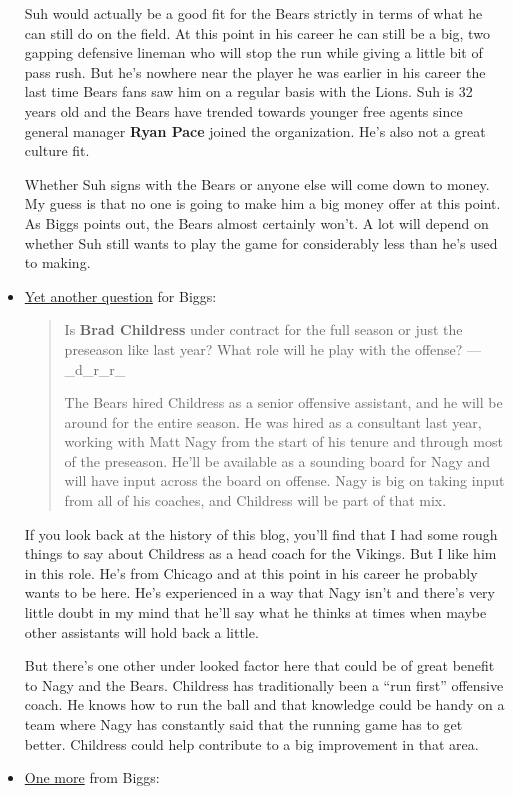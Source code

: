 \documentclass[11pt]{article}
\begin{document}
\begin{itemize}
Suh would actually be a good fit for the Bears strictly in terms of what he can still do on the field.  At this point in his career he can still be a big, two gapping defensive lineman who will stop the run while giving a little bit of pass rush.  But he's nowhere near the player he was earlier in his career the last time Bears fans saw him on a regular basis with the Lions.  Suh is 32 years old and the Bears have trended towards younger free agents since general manager \textbf{Ryan Pace} joined the organization.  He's also not a great culture fit.

Whether Suh signs with the Bears or anyone else will come down to money.  My guess is that no one is going to make him a big money offer at this point.  As Biggs points out, the Bears almost certainly won't.  A lot will depend on whether Suh still wants to play the game for considerably less than he's used to making.
\item \href{https://www.chicagotribune.com/sports/football/bears/ct-spt-bears-mailbag-receivers-kicker-competition-20190508-story.html}{Yet another question} for Biggs:

\begin{quote}
Is \textbf{Brad Childress} under contract for the full season or just the preseason like last year? What role will he play with the offense? — \@\_d\_r\_r\_

The Bears hired Childress as a senior offensive assistant, and he will be around for the entire season. He was hired as a consultant last year, working with Matt Nagy from the start of his tenure and through most of the preseason. He’ll be available as a sounding board for Nagy and will have input across the board on offense. Nagy is big on taking input from all of his coaches, and Childress will be part of that mix.
\end{quote}

If you look back at the history of this blog, you'll find that I had some rough things to say about Childress as a head coach for the Vikings.  But I like him in this role.  He's from Chicago and at this point in his career he probably wants to be here.  He's experienced in a way that Nagy isn't and there's very little doubt in my mind that he'll say what he thinks at times when maybe other assistants will hold back a little.  

But there's one other under looked factor here that could be of great benefit to Nagy and the Bears.  Childress has traditionally been a ``run first'' offensive coach.  He knows how to run the ball and that knowledge could be handy on a team where Nagy has constantly said that the running game has to get better.  Childress could help contribute to a big improvement in that area.
\item \href{https://www.chicagotribune.com/sports/football/bears/ct-spt-bears-mailbag-receivers-kicker-competition-20190508-story.html}{One more} from Biggs:


\end{itemize}
\end{document}
